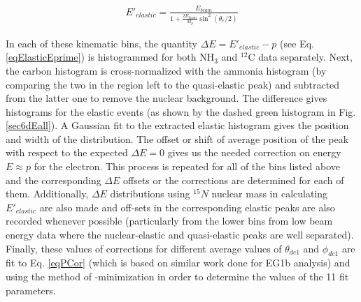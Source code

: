 \begin{eqnarray}
\label{eqElasticEprime}
E'_{elastic} = \frac{E_{beam}}{1+\frac{2E_{beam}}{M_p}\sin^2(\theta_e/2)}
\end{eqnarray}


In each of these kinematic bins, the quantity $\Delta E = E'_{elastic} - p$ (see Eq. \ref{eqElasticEprime}) is histogrammed for both NH$_3$ and $^{12}$C data separately. Next, the carbon histogram is cross-normalized with the ammonia histogram (by comparing the two in the region left to the quasi-elastic peak) and subtracted from the latter one to remove the nuclear background. The difference gives  histograms for the elastic events (as shown by the dashed green histogram in Fig. \ref{sec6dEall}). A Gaussian fit to the extracted elastic histogram gives the position and width of the distribution. The offset or shift of average position of the peak with respect to the expected $\Delta E = 0$ gives us the needed correction on energy $E \approx p$ for the electron. This process is repeated for all of the bins listed above and the corresponding $\Delta E$ offsets or the corrections are determined for each of them. Additionally, $\Delta E$ distributions using $^{15}N$ nuclear mass in calculating $E'_{elastic}$ are also made and off-sets in the corresponding elastic peaks are also recorded whenever possible (particularly from the lower \th bins from low beam energy data where the nuclear-elastic and quasi-elastic peaks are well separated).
Finally, these values of corrections for different average values of $\theta_{dc1}$ and $\phi_{dc1}$ are fit to Eq. \ref{eqPCor} (which is based on similar work done for EG1b analysis\cite{nGuler_th})
and using the method of \chisq-minimization in order to determine the values of the 11 fit parameters.



